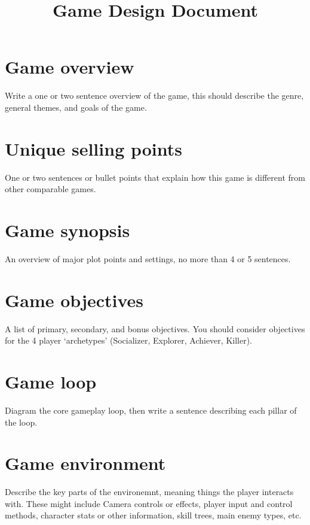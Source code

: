 \documentclass{article}
\title{Game Design Document}
\author{}
\date{}
\begin{document}
\maketitle
\vspace*{-4em}

\section{Game overview}
Write a one or two sentence overview of the game, this should describe the genre, general themes, and goals of the game.
\vspace{1in}

\section{Unique selling points}
One or two sentences or bullet points that explain how this game is different from other comparable games.
\vspace{1in}

\section{Game synopsis}
An overview of major plot points and settings, no more than 4 or 5 sentences.
\vspace{1in}

\section{Game objectives}
A list of primary, secondary, and bonus objectives. You should consider objectives for the 4 player `archetypes' (Socializer, Explorer, Achiever, Killer). 
\vspace{2in}
\vfill

\section{Game loop}
Diagram the core gameplay loop, then write a sentence describing each pillar of the loop.
\vspace{2in}

\section{Game environment}
Describe the key parts of the environemnt, meaning things the player interacts with. These might include Camera controls or effects, player input and control methods, character stats or other information, skill trees, main enemy types, etc.
\vspace{2in}
\end{document}
